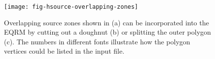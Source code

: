 \begin{figure}[htp]
\texttt{[image: fig-hsource-overlapping-zones]}
\caption{Overlapping source zones shown in (a) can be incorporated
into the EQRM by cutting out a doughnut (b) or splitting the outer
polygon (c). The numbers in different fonts illustrate how the
polygon vertices could be listed in the input file.
} \label{fig:h-source-overlapping}
\end{figure}





